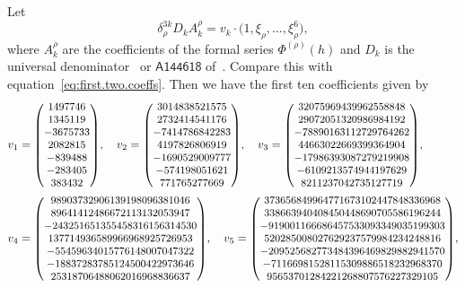 \documentclass[pdftex]{sigma}
\numberwithin{equation}{section}
\begin{document}
Let
\[
\delta_{\rho}^{3k}D_{k}A_{k}^{\rho}=v_k\cdot\bigl(1,\xi_{\rho},\dots,\xi_{\rho}^{6}\bigr),
\]
 where $A_{k}^{\rho}$ are the coefficients of the formal series $\Phi^{(\rho)}(h)$ and $D_{k}$ is the universal denominator~\cite[Section~9]{GZ:RQMOD} or $\mathsf{A144618}$ of~\cite{oeis}. Compare this with equation~\eqref{eq:first.two.coeffs}. Then we have the first ten coefficients given by
\begin{align*}
& v_{1} =\text{\small $\begin{pmatrix}1497746\\ 1345119\\ -3675733\\ 2082815\\ -839488\\ -283405\\ 383432\end{pmatrix}$},\quad
v_{2} =\text{\small $\begin{pmatrix}3014838521575\\ 2732414541176\\ -7414786842283\\ 4197826806919\\ -1690529009777\\ -574198051621\\ 771765277669\end{pmatrix}$},\quad
  v_{3} =\text{\small $\begin{pmatrix}32075969439962558848\\ 29072051320986984192\\ -78890163112729764262\\ 44663022669399364904\\ -17986393087279219908\\ -6109213574944197629\\ 8211237042735127719\end{pmatrix}$},\\
& v_{4}  =\text{\small $\begin{pmatrix}98903732906139198096381046\\ 89641412486672113132053947\\ -243251651355458316156314530\\ 137714936589966968925726953\\ -55459634015776148007047322\\ -18837283785124500422973646\\ 25318706488062016968836637\end{pmatrix}$},\quad
  v_{5} =\text{\small $\begin{pmatrix}373656849964771673102447848336968\\ 338663940408450448690705586196244\\ -919001166686457533093349035199303\\ 520285008027629237579984234248816\\ -209525682773484396469829882941570\\ -71166981528115309886518232968370\\ 95653701284221268807576227329105\end{pmatrix}$},\\

\end{align*}
\end{document}
